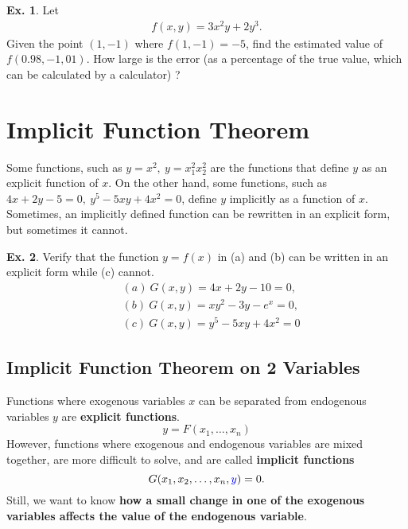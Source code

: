 \documentclass[10pt,a4paper]{book}
\newcommand{\blue}[1]{\textcolor{blue}{#1}}
\theoremstyle{definition}\newtheorem{definition}{Definition}
\theoremstyle{definition}\newtheorem{fact}{Fact}
\theoremstyle{definition}\newtheorem{ex}{Ex.}
\theoremstyle{definition}\newtheorem{project}{Project}
\theoremstyle{definition}\newtheorem{problem}{Problem}
\theoremstyle{definition}\newtheorem{example}{Example}
\numberwithin{theorem}{chapter}
\numberwithin{corollary}{chapter}
\numberwithin{assumption}{chapter}
\numberwithin{definition}{chapter}
\numberwithin{prop}{chapter}
\numberwithin{notation}{chapter}
\numberwithin{problem}{chapter}
\numberwithin{example}{chapter}
\numberwithin{fact}{chapter}
\numberwithin{ex}{chapter}
\begin{document}
	\begin{ex}
		Let 
		\begin{align*}
			f(x,y) = 3 x^2 y + 2 y^3. 
		\end{align*}
		Given the point $(1,-1)$ where $f(1,-1) = -5$, find the estimated value of $f(0.98, -1,01)$. How large is the error (as a percentage of the true value, which can be calculated by a calculator) ? 
	\end{ex}
	
	\section{Implicit Function Theorem}
	Some functions, such as $y=x^2, \ y=x_1^2 x_2^2$ are the functions that define $y$ as an explicit function of $x$. On the other hand, some functions, such as $4x + 2y - 5 = 0, \ y^5 - 5xy + 4x^2=0$, define $y$ implicitly as a function of $x$. Sometimes, an implicitly defined function can be rewritten in an explicit form, but sometimes it cannot. 
	\begin{ex}
		Verify that the function $y=f(x)$ in (a) and (b) can be written in an explicit form while (c) cannot.
		\begin{align*}
			&(a) \ G(x,y) = 4x + 2y - 10 = 0, \\
			&(b) \ G(x,y) = x y^2 - 3y - e^x = 0, \\
			&(c) \ G(x,y) = y^5 - 5xy + 4x^2=0
		\end{align*}
	\end{ex}
	
	\subsection{Implicit Function Theorem on 2 Variables}
	Functions where exogenous variables $x$ can be separated from endogenous variables $y$ are \textbf{explicit functions}.
	\begin{equation*}
		y = F(x_1, \dots, x_n)
	\end{equation*}
	However, functions where exogenous and endogenous variables are mixed together, are more difficult to solve, and are called \textbf{implicit functions}
	\begin{equation*}
		G(x_1, x_2, \dots, x_n, \blue{y}) = 0.
	\end{equation*}
	Still, we want to know \textbf{how a small change in one of the exogenous variables affects the value of the endogenous variable}.
	
\end{document}
